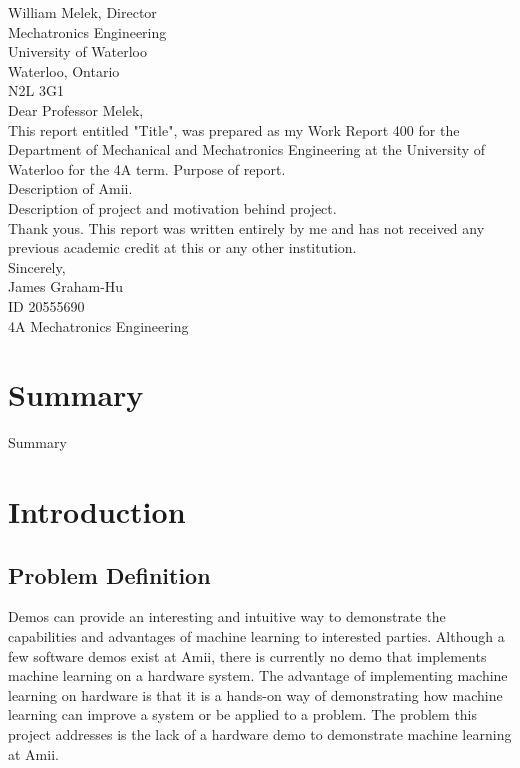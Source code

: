 \documentclass[letterpaper,12pt]{article}
\begin{document}
William Melek, Director\\
Mechatronics Engineering\\
University of Waterloo\\
Waterloo, Ontario\\
N2L 3G1\\

Dear Professor Melek,\\

This report entitled "Title", was prepared as my Work Report 400 for the Department of Mechanical and Mechatronics Engineering at the University of Waterloo for the 4A term. Purpose of report.\\

Description of Amii.\\

Description of project and motivation behind project.\\


Thank yous.
This report was written entirely by  me and has not received any previous academic credit at this or any other institution.\\

Sincerely,\\

James Graham-Hu\\
ID 20555690\\
4A Mechatronics Engineering



\pagebreak
\tableofcontents
\pagebreak
\listoffigures
\pagebreak
\listoftables
\pagebreak


\section{Summary}
Summary
\pagebreak
\section{Introduction}
\subsection{Problem Definition}
Demos can provide an interesting and intuitive way to demonstrate the capabilities and advantages of machine learning to interested parties. Although a few software demos exist at Amii, there is currently no demo that implements machine learning on a hardware system. The advantage of implementing machine learning on hardware is that it is a hands-on way of demonstrating how machine learning can improve a system or be applied to a problem. The problem this project addresses is the lack of a hardware demo to demonstrate machine learning at Amii.
\end{document}
